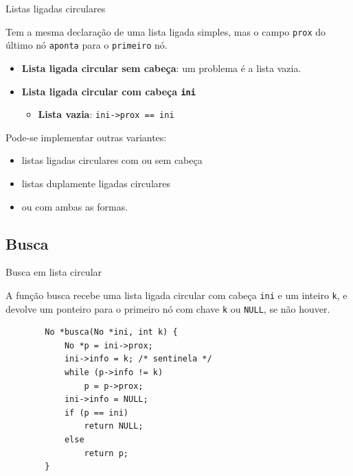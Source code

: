 \documentclass{beamer}
\newcommand{\cod}[1]{\texttt{#1}}
\begin{document}
\begin{frame}[fragile]{Listas ligadas circulares}

    Tem a mesma declaração de uma lista ligada simples, mas o campo \cod{prox} do último nó \cod{aponta} para o \cod{primeiro} nó.

    \begin{itemize}
        \item \textbf{Lista ligada circular sem cabeça}: um problema é a lista vazia.
        \item \textbf{Lista ligada circular com cabeça \cod{ini}}
        \begin{itemize}
            \item \textbf{Lista vazia}: \cod{ini->prox == ini}
        \end{itemize}
    \end{itemize}

    Pode-se implementar outras variantes:
    \begin{itemize}
        \item listas ligadas circulares com ou sem cabeça
        \item listas duplamente ligadas circulares
        \item ou com ambas as formas.
    \end{itemize}

\end{frame}

\subsection{Busca}

\begin{frame}[fragile]{Busca em lista circular}

    A função busca recebe uma lista ligada circular com cabeça \cod{ini} e um inteiro \cod{k}, e devolve um ponteiro para o primeiro nó com chave \cod{k} ou \cod{NULL}, se não houver.

    \begin{verbatim}
        No *busca(No *ini, int k) {
            No *p = ini->prox;
            ini->info = k; /* sentinela */
            while (p->info != k)
                p = p->prox;
            ini->info = NULL;
            if (p == ini)
                return NULL;
            else
                return p;
        }
    \end{verbatim}

\end{frame}
\end{document}
